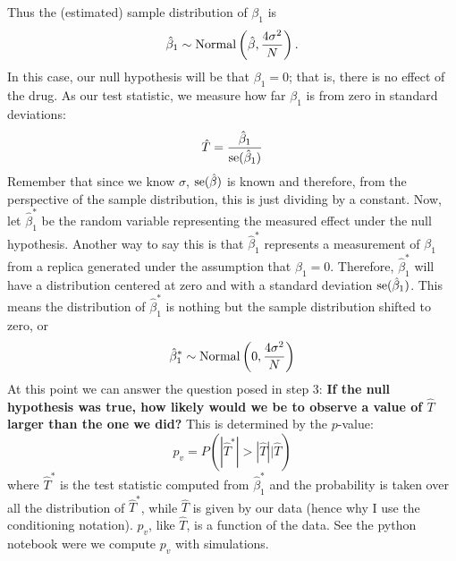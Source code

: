 \begin{itemize}
\begin{example}
Thus the (estimated) sample distribution of $\beta_1$ is 
\begin{equation*}
\hat{\beta}_1 \sim {\rm Normal}\left(\hat{\beta},\frac{4\sigma^2}{N}\right). 
\end{equation*}
In this case, our null hypothesis will be that $\beta_1  = 0$; that is, there is no effect of the drug. As our test statistic, we measure how far $\beta_1$ is from zero in standard deviations: 
\begin{equation*}
\hat{T} = \frac{\hat{\beta}_1}{{\rm se}(\hat{\beta}_1 )}
\end{equation*}
Remember that since we know $\sigma$,  ${\rm se}(\hat{\beta})$ is known and therefore, from the perspective of the sample distribution, this is just dividing by a constant. 
Now, let $\hat{\beta}_1^*$ be the random variable representing the measured effect under the null hypothesis. Another way to say this is that $\hat{\beta}_1^*$ represents a measurement of $\beta_1$ from a replica generated under the assumption that $\beta_1=0$. Therefore, $\hat{\beta}_1^*$ will have a distribution centered at zero and with a standard deviation ${\rm se}(\hat{\beta}_1)$. This means the distribution of $\hat{\beta}_1^*$ is nothing but the sample distribution shifted to zero, or 
\begin{equation*}
\hat{\beta}_1^* \sim {\rm Normal}\left(0,\frac{4\sigma^2}{N}\right)
\end{equation*}
 At this point we can answer the question posed in step 3: {\bf If the null hypothesis was true, how likely would we be to observe a value of $\hat{T}$ larger than the one we did?} This is determined by the $p$-value:
\begin{equation}\label{eq:pval}
p_v = P(|\hat{T}^*|>|\hat{T}||\hat{T})
\end{equation}
where $\hat{T}^*$ is the test statistic computed from $\hat{\beta}_1^*$ and the probability is taken over all the distribution of $\hat{T}^*$, while $\hat{T}$ is given by our data (hence why I use the conditioning notation). $p_v$, like $\hat{T}$, is a function of the data. See the python notebook were we compute $p_v$ with simulations. 


\end{example}
\end{itemize}
